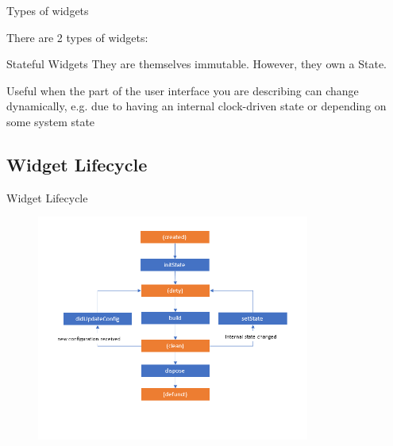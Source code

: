 \begin{frame}{Types of widgets}
    
    There are 2 types of widgets:
    
    \begin{block}{Stateful Widgets}
        They are themselves immutable. However, they own a State.
        
        Useful when the part of the user interface you are describing can change dynamically, e.g. due to having an internal clock-driven state or depending on some system state
    \end{block}
    
\end{frame}

\subsection{Widget Lifecycle}
\begin{frame}{Widget Lifecycle}
    \begin{figure}[h]
        \includegraphics[width=0.8\textwidth]{images/lifecycle.png}
    \end{figure}
\end{frame}